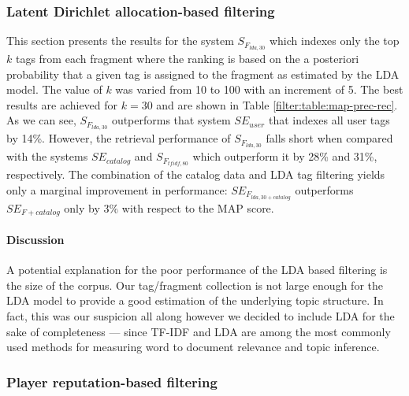 \subsubsection{Latent Dirichlet allocation-based filtering}
This section presents the results for the system $S_{F_{lda,30}}$ which indexes only the top $k$ tags from each fragment where the ranking is based on the a posteriori probability that a given tag is assigned to the fragment as estimated by the LDA model. The value of $k$ was varied from 10 to 100 with an increment of 5. The best results are achieved for $k=30$ and are shown in Table \ref{filter:table:map-prec-rec}. As we can see, $S_{F_{lda,30}}$ outperforms that system $SE_{user}$ that indexes all user tags by 14\%. However, the retrieval performance of $S_{F_{lda,30}}$ falls short when compared with the systems $SE_{catalog}$ and $S_{F_{tfidf,80}}$ which outperform it by 28\% and 31\%, respectively.
The combination of the catalog data and LDA tag filtering yields only a marginal improvement in performance: $SE_{F_{lda,30 + catalog}}$ outperforms $SE_{F+catalog}$ only by $3\%$ with respect to the MAP score.
\paragraph{Discussion} A potential explanation for the poor performance of the LDA based filtering is the size of the corpus. Our tag/fragment collection is not large enough for the LDA model to provide a good estimation of the underlying topic structure. In fact, this was our suspicion all along however we decided to include LDA for the sake of completeness --- since TF-IDF and LDA are among the most commonly used methods for measuring word to document relevance and topic inference.


\subsubsection{Player reputation-based filtering}

